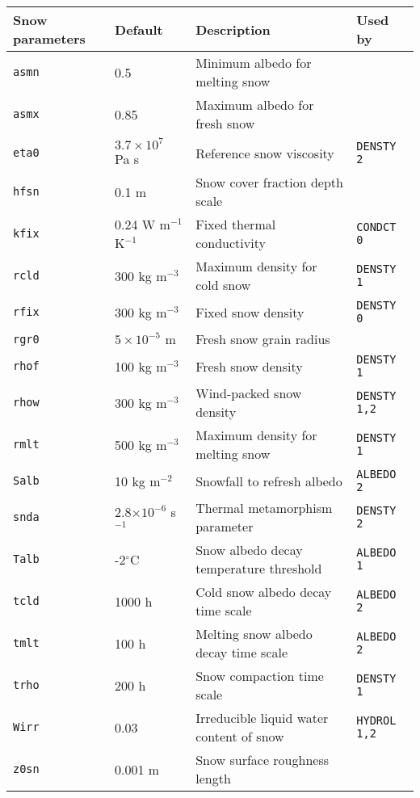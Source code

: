 \documentclass{article}
\begin{document}
\begin{longtable}{|l|l|l|l|} \hline
Snow parameters  & Default  & Description                             & Used by       \\ \hline
{\tt asmn} & 0.5            & Minimum albedo for melting snow         &               \\
{\tt asmx} & 0.85           & Maximum albedo for fresh snow           &               \\
{\tt eta0} & $3.7\times10^7$ Pa s & Reference snow viscosity          &{\tt DENSTY 2} \\
{\tt hfsn} & 0.1 m          & Snow cover fraction depth scale         &               \\
{\tt kfix} & 0.24 W m$^{-1}$ K$^{-1}$ & Fixed thermal conductivity    &{\tt CONDCT 0} \\
{\tt rcld} & 300 kg m$^{-3}$ & Maximum density for cold snow          &{\tt DENSTY 1} \\
{\tt rfix} & 300 kg m$^{-3}$ & Fixed snow density                     &{\tt DENSTY 0} \\
{\tt rgr0} & $5\times10^{-5}$ m & Fresh snow grain radius             &               \\
{\tt rhof} & 100 kg m$^{-3}$ & Fresh snow density                     &{\tt DENSTY 1} \\
{\tt rhow} & 300 kg m$^{-3}$ & Wind-packed snow density               &{\tt DENSTY 1,2} \\
{\tt rmlt} & 500 kg m$^{-3}$ & Maximum density for melting snow       &{\tt DENSTY 1} \\
{\tt Salb} & 10 kg m$^{-2}$ & Snowfall to refresh albedo              &{\tt ALBEDO 2} \\
{\tt snda} & 2.8$\times10^{-6}$ s$^{-1}$ & Thermal metamorphism parameter &{\tt DENSTY 2} \\
{\tt Talb} & -2$^\circ$C    & Snow albedo decay temperature threshold &{\tt ALBEDO 1} \\
{\tt tcld} & 1000 h         & Cold snow albedo decay time scale       &{\tt ALBEDO 2} \\
{\tt tmlt} & 100 h          & Melting snow albedo decay time scale    &{\tt ALBEDO 2} \\
{\tt trho} & 200 h          & Snow compaction time scale              &{\tt DENSTY 1} \\ 
{\tt Wirr} & 0.03           & Irreducible liquid water content of snow&{\tt HYDROL 1,2} \\
{\tt z0sn} & 0.001 m        & Snow surface roughness length           &               \\ \hline 
\end{longtable}
\end{document}
